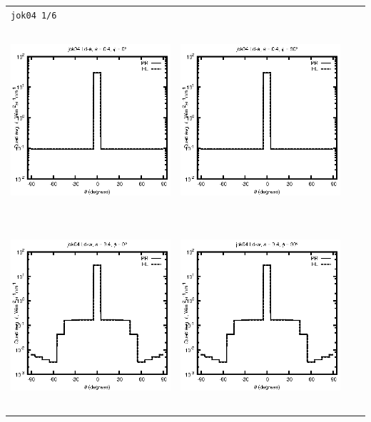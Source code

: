 \documentclass[10pt,a4paper]{article}
\begin{document}
\begin{adjustwidth}{-1.2in}{-1.2in}
\begin{tabular}{c c c c}
\multicolumn{4}{l}{\texttt{jok04 1/6}} \\
\includegraphics[height=7cm]{../eps/jok04_Ld_a_fwd.eps} &
\includegraphics[height=7cm]{../eps/jok04_Ld_a_cross.eps}\\
\includegraphics[height=7cm]{../eps/jok04_Ld_w_fwd.eps} &
\includegraphics[height=7cm]{../eps/jok04_Ld_w_cross.eps} \\

\end{tabular}
\end{adjustwidth}
\end{document}
